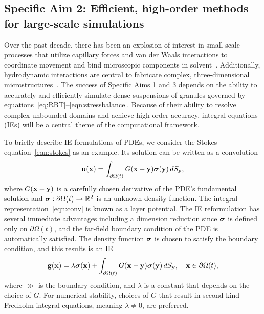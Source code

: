\subsection{Specific Aim 2: Efficient, high-order methods for
large-scale simulations}
\label{sec:specificaim2}
Over the past decade, there has been an explosion of interest in
small-scale processes that utilize capillary forces and van der Waals
interactions to coordinate movement and bind microscopic components in
solvent~\cite{Pandey2011, Zhang2017, Siontorou2017}. Additionally,
hydrodynamic interactions are central to fabricate complex,
three-dimensional microstructures~\cite{Dasgupta2017, Leong2007,
Reynolds2019, Cho2010}.
The success of Specific Aims 1 and 3 depends on the ability to
accurately and efficiently simulate dense suspensions of granules
governed by equations~\eqref{eq:RBT}--\eqref{eqn:stressbalance}. Because
of their ability to resolve complex unbounded domains and achieve
high-order accuracy, integral equations (IEs) will be a central theme of
the computational framework. 

To briefly describe IE formulations of PDEs, we consider the Stokes
equation~\eqref{eqn:stokes} as an example. Its solution can be written
as a convolution 
\begin{align}
  \mathbf{u}(\mathbf{x}) = \int_{\partial\Omega(t)} G(\mathbf{x} - \mathbf{y}) \boldsymbol{\sigma}(\mathbf{y}) \, dS_{\mathbf{y}},
  \label{eqn:conv}
\end{align}
where $G(\mathbf{x} - \mathbf{y})$ is a carefully chosen derivative of the PDE's
fundamental solution and $\boldsymbol{\sigma}: \partial \Omega(t) \rightarrow \mathbb{R}^2$
is an unknown density function. The integral
representation~\eqref{eqn:conv} is known as a layer potential.
The IE reformulation has several immediate advantages including a
dimension reduction since $\boldsymbol{\sigma}$ is defined only on $\partial
\Omega(t)$, and the far-field boundary condition of the PDE is
automatically satisfied. The density function $\boldsymbol{\sigma}$ is chosen to
satisfy the boundary condition, and this results is an IE 
\begin{align}
  \mathbf{g}(\mathbf{x}) = \lambda \boldsymbol{\sigma}(\mathbf{x}) + 
    \int_{\partial\Omega(t)} G(\mathbf{x} - \mathbf{y}) \boldsymbol{\sigma}(\mathbf{y}) \, dS_{\mathbf{y}},
    \quad \mathbf{x} \in \partial\Omega(t),
  \label{eqn:bie}
\end{align} where $\gg$ is the boundary condition, and $\lambda$ is a
constant that depends on the choice of $G$. For numerical stability,
choices of $G$ that result in second-kind Fredholm integral equations,
meaning $\lambda \neq 0$, are preferred.

